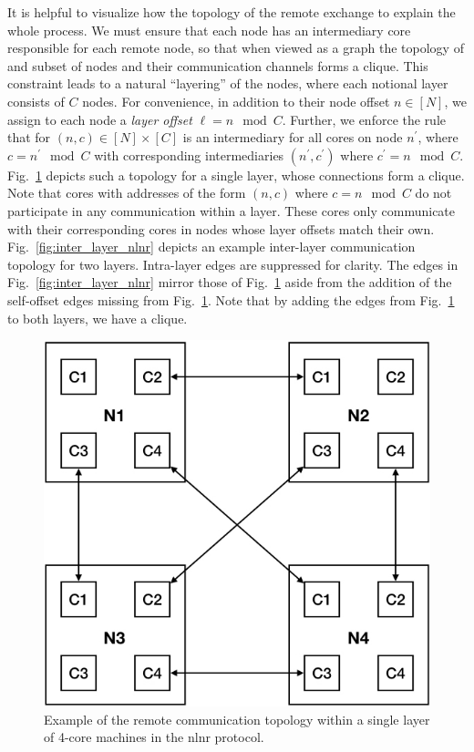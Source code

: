 \documentclass{report}
\begin{document}
It is helpful to visualize how the topology of the remote exchange to explain the whole process. 
We must ensure that each node has an intermediary core responsible for each remote node, so that when viewed as a graph the topology of and subset of nodes and their communication channels forms a clique. 
This constraint leads to a natural ``layering'' of the nodes, where each notional layer consists of $C$ nodes. 
For convenience, in addition to their node offset $n \in [N]$, we assign to each node a \emph{layer offset} $\ell = n \mod C$.
Further, we enforce the rule that for $(n,c) \in [N] \times [C]$ is an intermediary for all cores on node $n^\prime$, where $c = n^\prime \mod C$ with corresponding intermediaries $(n^\prime, c^\prime)$ where $c^\prime = n \mod C$. 
Fig.~\ref{fig:intra_layer_nlnr} depicts such a topology for a single layer, whose connections form a clique. 
Note that cores with addresses of the form $(n, c)$ where $c = n \mod C$ do not participate in any communication within a layer. 
These cores only communicate with their corresponding cores in nodes whose layer offsets match their own. 
Fig.~\ref{fig:inter_layer_nlnr} depicts an example inter-layer communication topology  for two layers. 
Intra-layer edges are suppressed for clarity. 
The edges in Fig.~\ref{fig:inter_layer_nlnr} mirror those of Fig.~\ref{fig:intra_layer_nlnr} aside from the addition of the self-offset edges missing from Fig.~\ref{fig:intra_layer_nlnr}.
Note that by adding the edges from Fig.~\ref{fig:intra_layer_nlnr} to both layers, we have a clique.


\begin{figure}[htbp] 
\centerline{\includegraphics[width=0.6\columnwidth]{intra_layer_nlnr}}
\caption{Example of the remote communication topology within a single layer of 4-core machines in the nlnr protocol.
\label{fig:intra_layer_nlnr}}
\end{figure}
\end{document}
